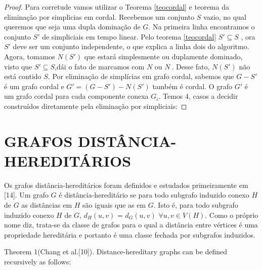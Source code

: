 \documentclass[a4paper,8pt]{article}
\theoremstyle{plain}
\begin{document}
\begin{proof}

Para corretude vamos utilizar o Teorema \ref{teocordal} e teorema da eliminação por simplicias em cordal. Recebemos um conjunto $S$ vazio, no qual queremos que seja uma dupla dominação de $G$. Na primeira linha encontramos o conjunto $S'$ de simpliciais em tempo linear. Pelo teorema \ref{teocordal} $S'\subseteq S$ , ora $S'$ deve ser um conjunto independente, o que explica a linha dois do algoritmo. Agora, tomamos $N(S')$ que estará simplesmente ou duplamente dominado, visto que $S'\subseteq S$,dái o fato de marcamos com $N$ ou $N^{~}$. Desse fato, 
$N(S')$ não está contido $S$.
Por eliminação de simplícias em grafo cordal, sabemos que $G-S'$ é um grafo cordal e $G'=(G-S')-N(S')$ também é cordal. O grafo $G'$ 
é um grafo cordal para cada componente conexa $G_i$. Temos 4, casos a decidir construídos diretamente pela eliminação por simpliciais:











  

 
 
\end{proof}


\section{GRAFOS DISTÂNCIA-HEREDITÁRIOS}

Os grafos distância-hereditários foram definidos e estudados primeiramente em [14]. Um grafo $G$ é distância-hereditário se para todo subgrafo induzido conexo $H$ de $G$ as distâncias em $H$ são iguais que as em $G$. Isto é, para todo subgrafo
induzido conexo $H$ de $G$, $d_H(u, v)$ = $d_G(u, v)$ $ \forall u, v \in V (H)$. Como o próprio nome diz, trata-se da classe de grafos para o qual a distância entre vértices é uma propriedade hereditária e portanto é uma classe fechada por subgrafos induzidos.











   
          Theorem 1(Chang et al.[10]). Distance-hereditary graphs can be defined recursively as follows:
   
\end{document}
